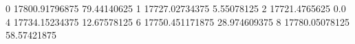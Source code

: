 0 17800.91796875 79.44140625
1 17727.02734375 5.55078125
2 17721.4765625 0.0
4 17734.15234375 12.67578125
6 17750.451171875 28.974609375
8 17780.05078125 58.57421875
